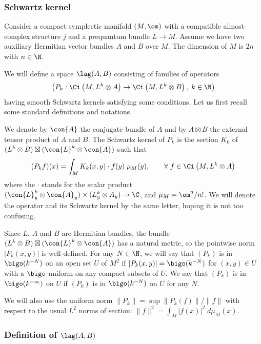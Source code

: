 \subsubsection{Schwartz kernel}

Consider a compact symplectic manifold $(M, \om)$ with a compatible almost-complex structure $j$ and a prequantum bundle $L \rightarrow M$. Assume we have two auxiliary Hermitian vector bundles $A$ and $B$ over $M$. The dimension of $M$ is $2n$ with $n \in \N$.


We will define a space $\lag (A, B)$ consisting of families of operators
\begin{gather}\label{eq:P_k_family}
\left(P_k : \Ci \left(M, L^k \otimes A\right) \rightarrow \Ci \left(M, L^k
\otimes B\right), \; k \in \N \right)
\end{gather}
having smooth Schwartz kernels satisfying some conditions. Let us first recall some standard definitions and notations.

 We denote by $\con{A}$ the conjugate bundle of $A$ and by $A \boxtimes B$ the external tensor product of $A$ and $B$.  The Schwartz kernel of $P_k$ is the section $K_k$ of $(L^k \otimes B) \boxtimes (\con{L}^k \otimes \con{A})$ such that
\[
(P_k f)(x) = \int_M K_k (x,y)\cdot f(y) \; \mu_M (y), \qquad \forall \;
f \in \Ci \left(M, L^k \otimes A\right)
\]
where the $\cdot$ stands for the scalar product $(\con{L}_y^k \otimes
\con{A}_y) \times (L_y^k \otimes A_y) \rightarrow \C$, and $\mu_M =
\om^n/n!$. We will denote the operator and its Schwartz kernel by the same letter, hoping it is not too confusing.

Since $L$, $A$ and $B$ are Hermitian bundles, the bundle $(L^k \otimes B) \boxtimes (\con{L}^k
\otimes \con{A})$ has a natural metric, so the pointwise norm $|P_k (x,y)|$ is well-defined. For any $N \in \N$, we will say that $(P_k)$ is in $\bigo (k^{-N})$ on an open set $U$ of $M^2$ if $|P_k (x,y)| =
\bigo (k^{-N})$ for $(x,y) \in U$ with a $\bigo$ uniform on any compact subsets of $U$. We say that $(P_k)$ is in $\bigo (k^{-\infty})$ on $U$ if $(P_k)$ is in $\bigo (k^{-N})$ on $U$ for any $N$.

We will also use the uniform norm $\| P_k \| = \sup \|P_k (f) \| / \| f\|$ with respect to the usual $L^2$ norms of section: $\|f\|^2 = \int_M |f(x)|^2
\; d\mu_M (x)$.


\subsubsection{Definition of $\lag (A,B)$}

